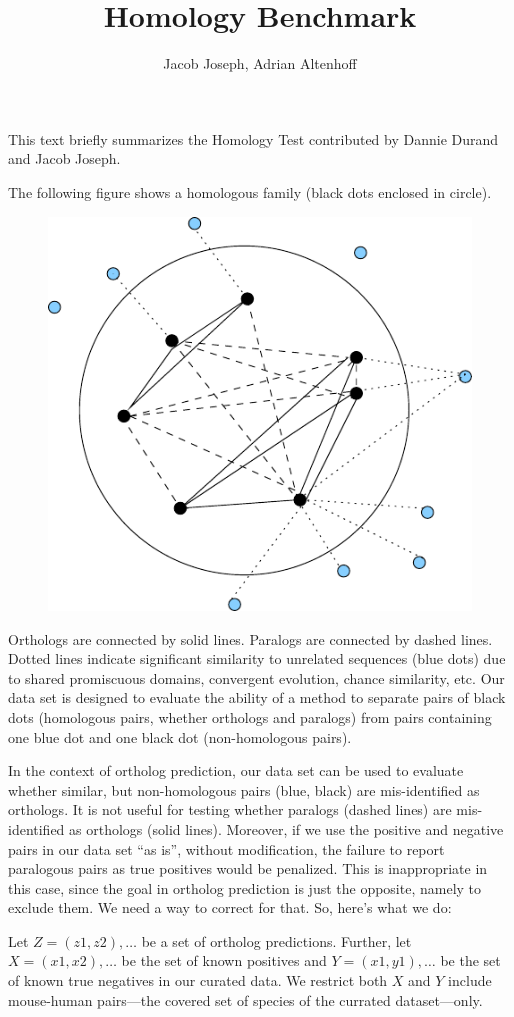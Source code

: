 \documentclass[a4paper,11pt]{article}
\title{Homology Benchmark}
\author{Jacob Joseph, Adrian Altenhoff}
\begin{document}
\maketitle
\tableofcontents

This text briefly summarizes the Homology Test contributed by Dannie Durand and Jacob Joseph.

The following figure shows a homologous family (black dots enclosed in circle). 
\begin{figure}[hbt]
  \begin{center}
    \includegraphics[width=.5\textwidth]{figures/homologyBenchmark}
    \label{fig}
  \end{center}
\end{figure}

Orthologs are connected by solid lines. Paralogs are connected by dashed lines. Dotted lines indicate significant similarity to unrelated
sequences (blue dots) due to shared promiscuous domains, convergent evolution, chance similarity, etc. Our
data set is designed to evaluate the ability of a method to separate pairs of black dots (homologous pairs, whether orthologs and paralogs) from pairs containing one blue dot and one black dot (non-homologous pairs).

In the context of ortholog prediction, our data set can be used to evaluate whether similar, but non-homologous pairs (blue, black) are mis-identified as orthologs. It is not useful for testing whether paralogs (dashed lines) are mis-identified as orthologs (solid lines). Moreover, if we use the positive and negative pairs in our data set ``as is'', without modification, the failure to report paralogous pairs as true positives would be penalized. This is inappropriate in this case, since the goal in ortholog prediction is just the opposite, namely to exclude
them. We need a way to correct for that. So, here’s what we do:

Let $Z = {(z1 , z2 ),\ldots}$ be a set of ortholog predictions. Further, let $X = {(x1 , x2 ), \ldots}$ be the set of known positives and $Y = {(x1 , y1 ), \ldots}$ be the set of known true negatives in our curated data. We restrict both $X$ and $Y$ include mouse-human pairs---the covered set of species of the currated dataset---only.
\end{document}

